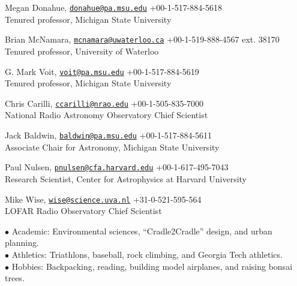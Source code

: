 \documentclass[12pt]{cv}
\begin{document}
\begin{llist}
Megan Donahue, \href{mailto:donahue@pa.msu.edu}{\tt donahue@pa.msu.edu} \hfill +00-1-517-884-5618\\
Tenured professor, Michigan State University

Brian McNamara, \href{mailto:mcnamara@uwaterloo.ca}{\tt mcnamara@uwaterloo.ca} \hfill +00-1-519-888-4567 ext. 38170\\
Tenured professor, University of Waterloo

G. Mark Voit, \href{mailto:voit@pa.msu.edu}{\tt voit@pa.msu.edu} \hfill +00-1-517-884-5619\\
Tenured professor, Michigan State University

Chris Carilli, \href{mailto:ccarilli@nrao.edu}{\tt ccarilli@nrao.edu} \hfill +00-1-505-835-7000\\
National Radio Astronomy Observatory Chief Scientist

Jack Baldwin, \href{mailto:baldwin@pa.msu.edu}{\tt baldwin@pa.msu.edu} \hfill +00-1-517-884-5611\\
Associate Chair for Astronomy, Michigan State University

Paul Nulsen, \href{mailto:pnulsen@cfa.harvard.edu}{\tt pnulsen@cfa.harvard.edu} \hfill +00-1-617-495-7043\\
Research Scientist, Center for Astrophysics at Harvard University

Mike Wise, \href{mailto:wise@science.uva.nl}{\tt wise@science.uva.nl} \hfill +31-0-521-595-564\\
LOFAR Radio Observatory Chief Scientist


$\bullet$ Academic: Environmental sciences, ``Cradle2Cradle'' design, and urban planning.\\
$\bullet$ Athletics: Triathlons, baseball, rock climbing, and Georgia Tech athletics.\\
$\bullet$ Hobbies: Backpacking, reading, building model airplanes, and raising bonsai trees.

\end{llist}
\end{document}

